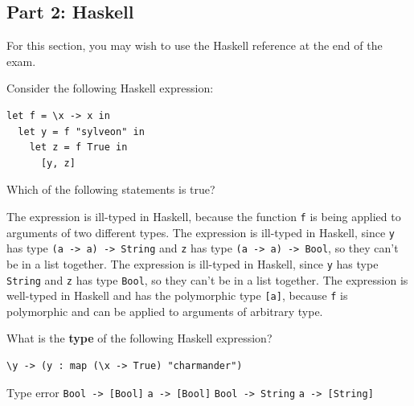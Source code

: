 \documentclass[addpoints]{exam}
\begin{document}
\begin{questions}

\newpage

\subsection*{\textbf{Part 2: Haskell}}

For this section, you may wish to use the Haskell reference at the end of the exam.

\question[4] Consider the following Haskell expression:

\begin{verbatim}
let f = \x -> x in
  let y = f "sylveon" in
    let z = f True in
      [y, z]
\end{verbatim}

Which of the following statements is true?

\begin{choices}
  \choice The expression is ill-typed in Haskell, because the function \verb|f| is being applied to arguments of two different types.
  \choice The expression is ill-typed in Haskell, since \verb|y| has type \verb|(a -> a) -> String| and \verb|z| has type \verb|(a -> a) -> Bool|, so they can't be in a list together.
  \CorrectChoice The expression is ill-typed in Haskell, since \verb|y| has type \verb|String| and \verb|z| has type \verb|Bool|, so they can't be in a list together.
  \choice The expression is well-typed in Haskell and has the polymorphic type \verb|[a]|, because \verb|f| is polymorphic and can be applied to arguments of arbitrary type.
\end{choices}

\question[3] What is the \textbf{type} of the following Haskell expression?

\begin{verbatim}
\y -> (y : map (\x -> True) "charmander")
\end{verbatim}

\begin{choices}
  \choice Type error
  \CorrectChoice \verb|Bool -> [Bool]|
  \choice \verb|a -> [Bool]|
  \choice \verb|Bool -> String|
  \choice \verb|a -> [String]|
\end{choices}


\end{questions}
\end{document}
